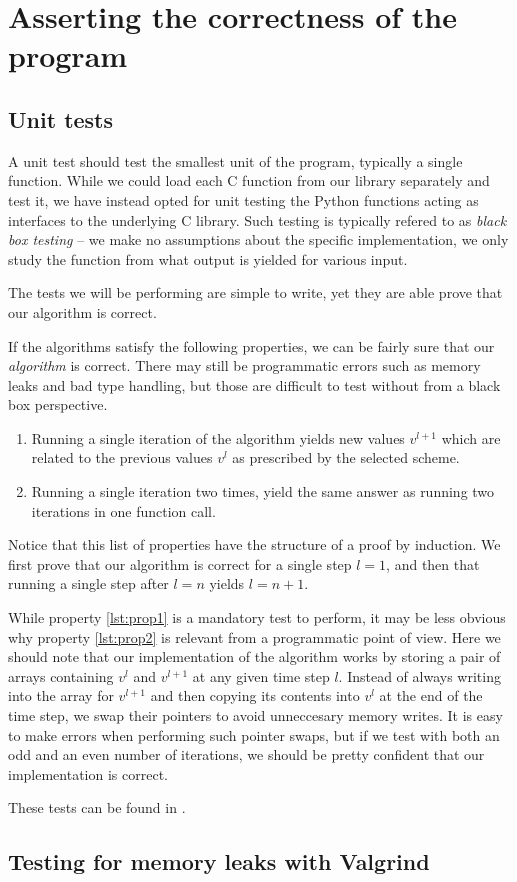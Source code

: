 \section{Asserting the correctness of the program}
\label{appx:testing}
\subsection{Unit tests}
A unit test should test the smallest unit of the program, typically a single function. While we could load each C function from our library separately and test it, we have instead opted for unit testing the Python functions acting as interfaces to the underlying C library. Such testing is typically refered to as \emph{black box testing} -- we make no assumptions about the specific implementation, we only study the function from what output is yielded for various input.

The tests we will be performing are simple to write, yet they are able prove that our algorithm is correct.

If the algorithms satisfy the following properties, we can be fairly sure that our \emph{algorithm} is correct. There may still be programmatic errors such as memory leaks and bad type handling, but those are difficult to test without from a black box perspective.
\begin{enumerate}[label=(\roman*)]
    \item Running a single iteration of the algorithm yields new values $v^{l+1}$ which are related to the previous values $v^l$ as prescribed by the selected scheme. \label{lst:prop1}
    \item Running a single iteration two times, yield the same answer as running two iterations in one function call.\label{lst:prop2}
\end{enumerate}

Notice that this list of properties have the structure of a proof by induction. We first prove that our algorithm is correct for a single step $l = 1$, and then that running a single step after $l = n$ yields $l = n+1$.

While property \ref{lst:prop1} is a mandatory test to perform, it may be less obvious why property \ref{lst:prop2} is relevant from a programmatic point of view. Here we should note that our implementation of the algorithm works by storing a pair of arrays containing $v^l$ and $v^{l+1}$ at any given time step $l$. Instead of always writing into the array for $v^{l+1}$ and then copying its contents into $v^l$ at the end of the time step, we swap their pointers to avoid unneccesary memory writes. It is easy to make errors when performing such pointer swaps, but if we test with both an odd and an even number of iterations, we should be pretty confident that our implementation is correct.

These tests can be found in .

\subsection{Testing for memory leaks with Valgrind}
